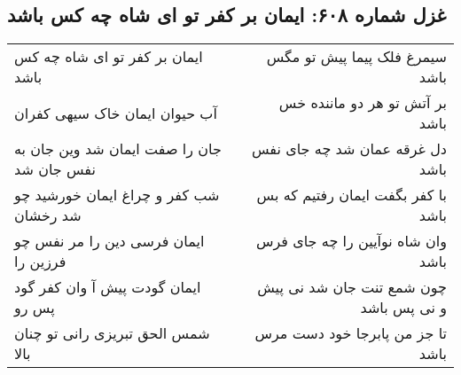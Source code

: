 \begin{center}
\section*{غزل شماره ۶۰۸: ایمان بر کفر تو ای شاه چه کس باشد}
\label{sec:0608}
\begin{longtable}{l p{0.5cm} r}
ایمان بر کفر تو ای شاه چه کس باشد
&&
سیمرغ فلک پیما پیش تو مگس باشد
\\
آب حیوان ایمان خاک سیهی کفران
&&
بر آتش تو هر دو ماننده خس باشد
\\
جان را صفت ایمان شد وین جان به نفس جان شد
&&
دل غرقه عمان شد چه جای نفس باشد
\\
شب کفر و چراغ ایمان خورشید چو شد رخشان
&&
با کفر بگفت ایمان رفتیم که بس باشد
\\
ایمان فرسی دین را مر نفس چو فرزین را
&&
وان شاه نوآیین را چه جای فرس باشد
\\
ایمان گودت پیش آ وان کفر گود پس رو
&&
چون شمع تنت جان شد نی پیش و نی پس باشد
\\
شمس الحق تبریزی رانی تو چنان بالا
&&
تا جز من پابرجا خود دست مرس باشد
\\
\end{longtable}
\end{center}
